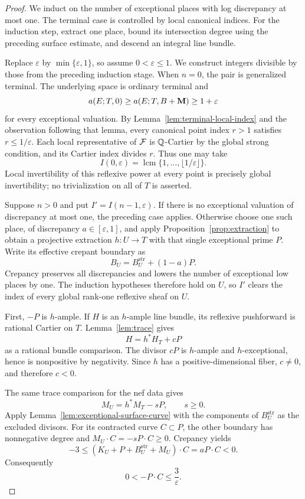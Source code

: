 \begin{proof}
We induct on the number of exceptional places with log discrepancy at
most one.  The terminal case is controlled by local canonical indices.
For the induction step, extract one place, bound its intersection degree
using the preceding surface estimate, and descend an integral line bundle.

Replace $\varepsilon$ by $\min\{\varepsilon,1\}$, so assume
$0<\varepsilon\leq1$.  We construct integers divisible by those from the
preceding induction stage.  When $n=0$, the pair is generalized terminal.
The underlying space is ordinary terminal and
\[
 a(E;T,0)\geq a(E;T,B+\mathbf M)\geq1+\varepsilon
\]
for every exceptional valuation.  By
Lemma~\ref{lem:terminal-local-index} and the observation following that
lemma, every canonical point index $r>1$ satisfies
$r\leq1/\varepsilon$.  Each local representative of $\mathcal F$ is
$\mathbb Q$-Cartier by the global strong condition, and its Cartier index divides
$r$.  Thus one may take
\[
 I(0,\varepsilon)=\operatorname{lcm}
                     \{1,\ldots,\lfloor1/\varepsilon\rfloor\}.
\]
Local invertibility of this reflexive power at every point is precisely
global invertibility; no trivialization on all of $T$ is asserted.

Suppose $n>0$ and put $I'=I(n-1,\varepsilon)$.  If there is no exceptional
valuation of discrepancy at most one, the preceding case applies.  Otherwise
choose one such place, of discrepancy $a\in[\varepsilon,1]$, and apply
Proposition~\ref{prop:extraction} to obtain a projective extraction
$h:U\to T$ with that single exceptional prime $P$.  Write its effective
crepant boundary as
\[
 B_U=B_U^{\mathrm{str}}+(1-a)P.
\]
Crepancy preserves all discrepancies and lowers the number of exceptional
low places by one.  The induction hypotheses therefore hold on $U$, so
$I'$ clears the index of every global rank-one reflexive sheaf on $U$.

First, $-P$ is $h$-ample.  If $H$ is an $h$-ample line bundle, its reflexive
pushforward is rational Cartier on $T$.  Lemma~\ref{lem:trace} gives
\[
 H=h^*H_T+cP
\]
as a rational bundle comparison.  The divisor $cP$ is $h$-ample and
$h$-exceptional, hence is nonpositive by negativity.  Since $h$ has a
positive-dimensional fiber, $c\neq0$, and therefore $c<0$.

The same trace comparison for the nef data gives
\[
 M_U=h^*M_T-sP,\qquad s\geq0.
\]
Apply Lemma~\ref{lem:exceptional-surface-curve} with the components of
$B_U^{\mathrm{str}}$ as the excluded divisors.  For its contracted curve
$C\subset P$, the other boundary has nonnegative degree and
$M_U\cdot C=-sP\cdot C\geq0$.  Crepancy yields
\[
 -3\leq(K_U+P+B_U^{\mathrm{str}}+M_U)\cdot C
         =aP\cdot C<0.
\]
Consequently
\begin{equation}\label{eq:exceptional-degree-bound}
 0<-P\cdot C\leq\frac{3}{\varepsilon}.
\end{equation}


\end{proof}
